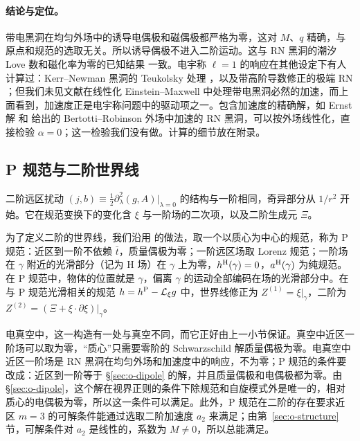 \documentclass[11pt,a4paper]{ctexart}
\begin{document}
\paragraph{结论与定位。}带电黑洞在均匀外场中的诱导电偶极和磁偶极都严格为零，这对 $M$、$q$ 精确，与原点和规范的选取无关。所以诱导偶极不进入二阶运动。这与 RN 黑洞的潮汐 Love 数和磁化率为零的已知结果 \citep{CardosoEtAl2017,PereniguezCardoso2022} 一致。电宇称 $\ell=1$ 的响应在其他设定下有人计算过：Kerr--Newman 黑洞的 Teukolsky 处理 \citep{ChakrabortyEtAl2026}，以及带高阶导数修正的极端 RN \citep{NoumiWong2026}；但我们未见文献在线性化 Einstein--Maxwell 中处理带电黑洞必然的加速，而上面看到，加速度正是电宇称问题中的驱动项之一。包含加速度的精确解，如 Ernst 解 \citep{Ernst1976} 和 \citet{OvcharenkoPodolsky2026} 给出的 Bertotti--Robinson 外场中加速的 RN 黑洞，可以按外场线性化，直接检验 $\alpha=0$；这一检验我们没有做。计算的细节放在附录。

\subsection{P 规范与二阶世界线}\label{sec:second-P}

二阶远区扰动 $(j,b)\equiv\tfrac12\partial_\lambda^2(g,A)|_{\lambda=0}$ 的结构与一阶相同，奇异部分从 $1/r^2$ 开始。它在规范变换下的变化含 $\xi$ 与一阶场的二次项，以及二阶生成元 $\Xi$。

为了定义二阶的世界线，我们沿用 \citet{Gralla2012} 的做法，取一个以质心为中心的规范，称为 P 规范：近区到一阶不依赖 $\bar t$，质量偶极为零；一阶远区场取 Lorenz 规范；一阶场在 $\gamma$ 附近的光滑部分（记为 H 场）在 $\gamma$ 上为零，$h^{\rm H}(\gamma)=0$，$a^{\rm H}(\gamma)$ 为纯规范。在 P 规范中，物体的位置就是 $\gamma$，偏离 $\gamma$ 的运动全部编码在场的光滑部分中。在与 P 规范光滑相关的规范 $h=h^{\rm P}-\mathcal L_\xi g$ 中，世界线修正为 $Z^{(1)}=\xi|_\gamma$，二阶为 $Z^{(2)}=(\Xi+\xi\cdot\partial\xi)|_\gamma$。

电真空中，这一构造有一处与真空不同，而它正好由上一小节保证。真空中近区一阶场可以取为零，“质心”只需要零阶的 Schwarzschild 解质量偶极为零。电真空中近区一阶场是 RN 黑洞在均匀外场和加速度中的响应，不为零；P 规范的条件要改成：近区到一阶等于 \S\ref{sec:o-dipole} 的解，并且质量偶极和电偶极都为零。由 \S\ref{sec:o-dipole}，这个解在视界正则的条件下除规范和自旋模式外是唯一的，相对质心的电偶极为零，所以这一条件可以满足。此外，P 规范在二阶的存在要求近区 $m=3$ 的可解条件能通过选取二阶加速度 $a_2$ 来满足；由第~\ref{sec:o-structure} 节，可解条件对 $a_2$ 是线性的，系数为 $M\neq0$，所以总能满足。
\end{document}
